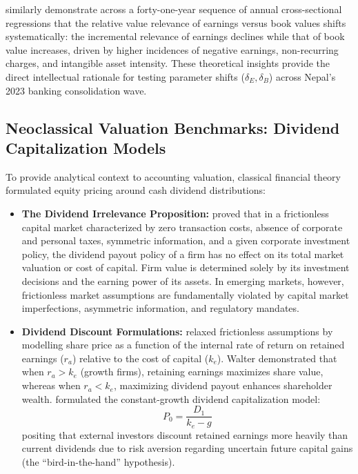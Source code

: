 \citet{collins1997} similarly demonstrate across a forty-one-year sequence of annual cross-sectional regressions that the relative value relevance of earnings versus book values shifts systematically: the incremental relevance of earnings declines while that of book value increases, driven by higher incidences of negative earnings, non-recurring charges, and intangible asset intensity. These theoretical insights provide the direct intellectual rationale for testing parameter shifts ($\delta_E, \delta_B$) across Nepal's 2023 banking consolidation wave.

\subsection{Neoclassical Valuation Benchmarks: Dividend Capitalization Models}
\label{subsec:dividend_models}

To provide analytical context to accounting valuation, classical financial theory formulated equity pricing around cash dividend distributions:
\begin{itemize}
\item \textbf{The Dividend Irrelevance Proposition:} \citet{miller1961} proved that in a frictionless capital market characterized by zero transaction costs, absence of corporate and personal taxes, symmetric information, and a given corporate investment policy, the dividend payout policy of a firm has no effect on its total market valuation or cost of capital. Firm value is determined solely by its investment decisions and the earning power of its assets. In emerging markets, however, frictionless market assumptions are fundamentally violated by capital market imperfections, asymmetric information, and regulatory mandates.
\item \textbf{Dividend Discount Formulations:} \citet{walter1963} relaxed frictionless assumptions by modelling share price as a function of the internal rate of return on retained earnings ($r_a$) relative to the cost of capital ($k_e$). Walter demonstrated that when $r_a > k_e$ (growth firms), retaining earnings maximizes share value, whereas when $r_a < k_e$, maximizing dividend payout enhances shareholder wealth. \citet{gordon1959} formulated the constant-growth dividend capitalization model:
\begin{equation}
P_0 = \frac{D_1}{k_e - g}
\end{equation}
positing that external investors discount retained earnings more heavily than current dividends due to risk aversion regarding uncertain future capital gains (the ``bird-in-the-hand'' hypothesis).
\end{itemize}

